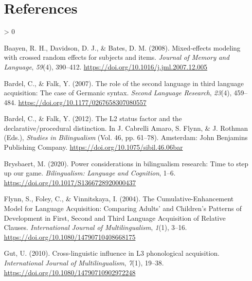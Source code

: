 \documentclass[
  english,
  man]{apa6}
\newlength{\cslhangindent}
\newenvironment{CSLReferences}[2] %
 {%
  \setlength{\parindent}{0pt}
  \ifodd #1 \everypar{\setlength{\hangindent}{\cslhangindent}}\ignorespaces\fi
  \ifnum #2 > 0
  \setlength{\parskip}{#2\baselineskip}
  \fi
 }%
 {}
\begin{document}
\newpage

\hypertarget{references}{%
\section{References}\label{references}}

\begingroup
\setlength{\parindent}{-0.5in}
\setlength{\leftskip}{0.5in}

\hypertarget{refs}{}
\begin{CSLReferences}{1}{0}
\leavevmode\hypertarget{ref-baayen_mixed-effects_2008}{}%
Baayen, R. H., Davidson, D. J., \& Bates, D. M. (2008). Mixed-effects modeling with crossed random effects for subjects and items. \emph{Journal of Memory and Language}, \emph{59}(4), 390--412. \url{https://doi.org/10.1016/j.jml.2007.12.005}

\leavevmode\hypertarget{ref-bardel_role_2007}{}%
Bardel, C., \& Falk, Y. (2007). The role of the second language in third language acquisition: The case of {Germanic} syntax. \emph{Second Language Research}, \emph{23}(4), 459--484. \url{https://doi.org/10.1177/0267658307080557}

\leavevmode\hypertarget{ref-cabrelli_amaro_l2_2012}{}%
Bardel, C., \& Falk, Y. (2012). The {L2} status factor and the declarative/procedural distinction. In J. Cabrelli Amaro, S. Flynn, \& J. Rothman (Eds.), \emph{Studies in {Bilingualism}} (Vol. 46, pp. 61--78). Amsterdam: John Benjamins Publishing Company. \url{https://doi.org/10.1075/sibil.46.06bar}

\leavevmode\hypertarget{ref-brysbaert_power_2020}{}%
Brysbaert, M. (2020). Power considerations in bilingualism research: {Time} to step up our game. \emph{Bilingualism: Language and Cognition}, 1--6. \url{https://doi.org/10.1017/S1366728920000437}

\leavevmode\hypertarget{ref-flynn_cumulative-enhancement_2004}{}%
Flynn, S., Foley, C., \& Vinnitskaya, I. (2004). The {Cumulative}-{Enhancement} {Model} for {Language} {Acquisition}: {Comparing} {Adults}' and {Children}'s {Patterns} of {Development} in {First}, {Second} and {Third} {Language} {Acquisition} of {Relative} {Clauses}. \emph{International Journal of Multilingualism}, \emph{1}(1), 3--16. \url{https://doi.org/10.1080/14790710408668175}

\leavevmode\hypertarget{ref-gut_cross-linguistic_2010}{}%
Gut, U. (2010). Cross-linguistic influence in {L3} phonological acquisition. \emph{International Journal of Multilingualism}, \emph{7}(1), 19--38. \url{https://doi.org/10.1080/14790710902972248}


\end{CSLReferences}
\end{document}
